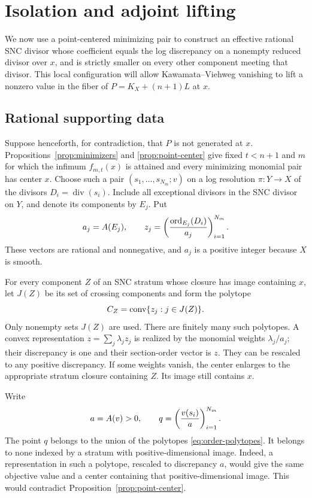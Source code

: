 \section{Isolation and adjoint lifting}
\label{sec:isolation}

We now use a point-centered minimizing pair to construct an effective
rational SNC divisor whose coefficient equals the log discrepancy on a
nonempty reduced divisor over $x$, and is strictly smaller on every
other component meeting that divisor. This local configuration will
allow Kawamata--Viehweg vanishing to lift a nonzero value in the fiber
of $P=K_X+(n+1)L$ at $x$.

\subsection{Rational supporting data}

Suppose henceforth, for contradiction, that \(P\) is not generated
at \(x\).  Propositions~\ref{prop:minimizers} and
\ref{prop:point-center} give fixed \(t<n+1\) and \(m\) for which the
infimum \(f_{m,t}(x)\) is attained and every minimizing monomial pair
has center \(x\).  Choose such a pair \((s_1,\ldots,s_{N_m};v)\)
on a log resolution \(\pi:Y\to X\) of the divisors
\(D_i=\operatorname{div}(s_i)\).  Include all exceptional divisors in
the SNC divisor on \(Y\), and denote its components by \(E_j\).
Put
\[
 a_j=A(E_j),\qquad
 z_j=\left(\frac{\operatorname{ord}_{E_j}(D_i)}{a_j}\right)_{i=1}^{N_m}.
\]
These vectors are rational and nonnegative, and \(a_j\) is a positive
integer because \(X\) is smooth.

For every component \(Z\) of an SNC stratum whose closure has image
containing \(x\), let \(J(Z)\) be its set of crossing components and
form the polytope
\begin{equation}
 C_Z=\operatorname{conv}\{z_j:j\in J(Z)\}.
 \label{eq:order-polytopes}
\end{equation}
Only nonempty sets \(J(Z)\) are used.  There are finitely many such
polytopes.  A convex representation \(z=\sum_j\lambda_jz_j\) is
realized by the monomial weights \(\lambda_j/a_j\); their discrepancy
is one and their section-order vector is \(z\).  They can be rescaled
to any positive discrepancy.  If some weights vanish, the center
enlarges to the appropriate stratum closure containing \(Z\).
Its image still contains \(x\).

Write
\[
 a=A(v)>0,
 \qquad q=\left(\frac{v(s_i)}a\right)_{i=1}^{N_m}.
\]
The point \(q\) belongs to the union of the polytopes
\eqref{eq:order-polytopes}.  It belongs to none indexed by a stratum
with positive-dimensional image.  Indeed, a representation in such
a polytope, rescaled to discrepancy \(a\), would give the same
objective value and a center containing that positive-dimensional
image.  This would contradict Proposition~\ref{prop:point-center}.

